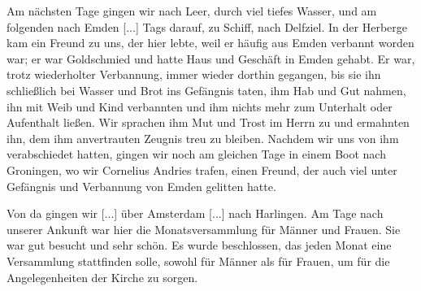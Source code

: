 Am nächsten Tage gingen wir nach Leer, durch viel tiefes
Wasser, und am folgenden nach Emden [...] Tags darauf, zu
Schiff, nach Delfziel. In der Herberge kam ein Freund zu uns,
der hier lebte, weil er häufig aus Emden verbannt worden war;
er war Goldschmied und hatte Haus und Geschäft in Emden gehabt. 
Er war, trotz wiederholter Verbannung, immer wieder
dorthin gegangen, bis sie ihn schließlich bei Wasser und Brot ins
Gefängnis taten, ihm Hab und Gut nahmen, ihn mit Weib und
Kind verbannten und ihm nichts mehr zum Unterhalt oder
Aufenthalt ließen. Wir sprachen ihm Mut und Trost im Herrn
zu und ermahnten ihn, dem ihm anvertrauten Zeugnis treu zu
bleiben. Nachdem wir uns von ihm verabschiedet hatten, gingen
wir noch am gleichen Tage in einem Boot nach Groningen, wo
wir Cornelius Andries trafen, 
einen Freund, der auch viel unter
Gefängnis und Verbannung von Emden gelitten hatte.

Von da gingen wir [...] über Amsterdam [...] nach Harlingen.
Am Tage nach unserer Ankunft war hier die Monatsversammlung
für Männer und Frauen. Sie war gut besucht und sehr schön.
Es wurde beschlossen, das jeden Monat eine Versammlung stattfinden 
solle, sowohl für Männer als für Frauen, um für die
Angelegenheiten der Kirche zu sorgen.

